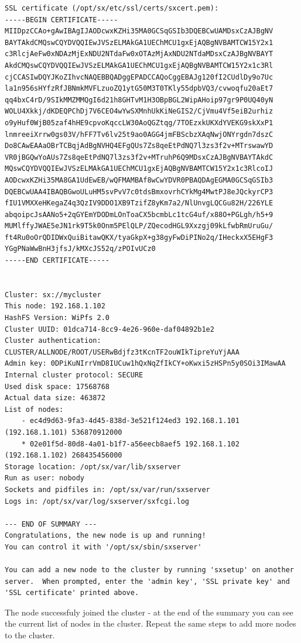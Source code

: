 \begin{lstlisting}
SSL certificate (/opt/sx/etc/ssl/certs/sxcert.pem):
-----BEGIN CERTIFICATE-----
MIIDpzCCAo+gAwIBAgIJAODcwxKZHi35MA0GCSqGSIb3DQEBCwUAMDsxCzAJBgNV
BAYTAkdCMQswCQYDVQQIEwJVSzELMAkGA1UEChMCU1gxEjAQBgNVBAMTCW15Y2x1
c3RlcjAeFw0xNDAzMjExNDU2NTdaFw0xOTAzMjAxNDU2NTdaMDsxCzAJBgNVBAYT
AkdCMQswCQYDVQQIEwJVSzELMAkGA1UEChMCU1gxEjAQBgNVBAMTCW15Y2x1c3Rl
cjCCASIwDQYJKoZIhvcNAQEBBQADggEPADCCAQoCggEBAJg120fI2CUdlDy9o7Uc
la1n956sHYfzRfJBNmkMVFLzuoZQ1ytG50M3T0TKly55dpbVQ3/cvwoqfu20aEt7
qq4bxC4rD/9SIkMMZMMQgI6d21h8GHTvM1H3OBpBGL2WipAHoip97gr9P0UQ40yN
WOLU4Xkkj/dKDEQPChDj7V6CEO4wYwSXMnhUkKiNeGIS2/CjVmu4Vf5eiB2urhiz
o9yHuf0WjB05zaf4hHE9cpvoKqccLW30AoQGZtqg/7TOEzxkUKXdYVEKG9skXxP1
lnmreeiXrrw0gs03V/hFF7Tv6lv25t9ao0AGG4jmFBScbzXAqNwjONYrgdn7dszC
Do8CAwEAAaOBrTCBqjAdBgNVHQ4EFgQUs7Zs8qeEtPdNQ7l3zs3f2v+MTrswawYD
VR0jBGQwYoAUs7Zs8qeEtPdNQ7l3zs3f2v+MTruhP6Q9MDsxCzAJBgNVBAYTAkdC
MQswCQYDVQQIEwJVSzELMAkGA1UEChMCU1gxEjAQBgNVBAMTCW15Y2x1c3RlcoIJ
AODcwxKZHi35MA8GA1UdEwEB/wQFMAMBAf8wCwYDVR0PBAQDAgEGMA0GCSqGSIb3
DQEBCwUAA4IBAQBGwoULuHM5svPvV7c0tdsBmxovrhCYkMg4MwtPJ8eJQckyrCP3
fIU1VMXXeHKegaZ4q3QzIV9DDO1XB9TzifZ8yKm7a2/NlUnvgLQCGu82H/226YLE
abqoipcJsAANo5+2qGYEmYDODmLOnToaCX5bcmbLc1tcG4uf/x88O+PGLgh/h5+9
MUMlffyJWAE5eJN1rk9T5k0Onm5PElQLP/ZQecodHGL9Xxzgj09kLfwbRmUruGu/
ft4Ru0oOrQDIDWxQuiBitawQKX/tyaGkpX+g38gyFwDiPINo2q/IHeckxX5EHgF3
YGgPNaWwBnH3jfsJ/kMXcJS52q/zPOIvUCz0
-----END CERTIFICATE-----


Cluster: sx://mycluster
This node: 192.168.1.102
HashFS Version: WiPfs 2.0
Cluster UUID: 01dca714-8cc9-4e26-960e-daf04892b1e2
Cluster authentication: CLUSTER/ALLNODE/ROOT/USERwBdjfz3tKcnTF2ouWIkTipreYuYjAAA
Admin key: 0DPiKuNIrrVmD8IUCuw1hQxNqZfIkCY+oKwxi5zHSPn5y0SOi3IMawAA
Internal cluster protocol: SECURE
Used disk space: 17568768
Actual data size: 463872
List of nodes:
    - ec4d9d63-9fa3-4d45-838d-3e521f124ed3 192.168.1.101 (192.168.1.101) 536870912000
    * 02e01f5d-80d8-4a01-b1f7-a56eecb8aef5 192.168.1.102 (192.168.1.102) 268435456000
Storage location: /opt/sx/var/lib/sxserver
Run as user: nobody
Sockets and pidfiles in: /opt/sx/var/run/sxserver
Logs in: /opt/sx/var/log/sxserver/sxfcgi.log

--- END OF SUMMARY ---
Congratulations, the new node is up and running!
You can control it with '/opt/sx/sbin/sxserver'

You can add a new node to the cluster by running 'sxsetup' on another
server.  When prompted, enter the 'admin key', 'SSL private key' and
'SSL certificate' printed above.
\end{lstlisting}
\LARGE
The node successfuly joined the cluster - at the end of the summary you can
see the current list of nodes in the cluster. Repeat the same steps
to add more nodes to the cluster.

